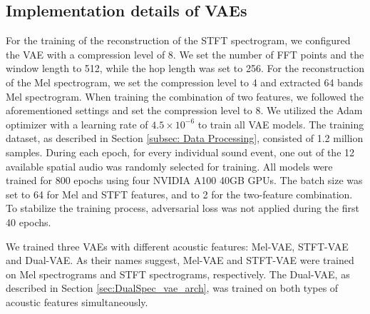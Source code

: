 \documentclass{IEEEtran}
\begin{document}
\subsection{Implementation details of VAEs}
\label{subsec: Implementation details of VAE}
For the training of the reconstruction of the STFT spectrogram, we configured the VAE with a compression level of 8. We set the number of FFT points and the window length to 512, while the hop length was set to 256. For the reconstruction of the Mel spectrogram, we set the compression level to 4 and extracted 64 bands Mel spectrogram. When training the combination of two features, we followed the aforementioned settings and set the compression level to 8. We utilized the Adam optimizer \cite{kingma2014adam} with a learning rate of $4.5 \times 10^{-6}$ to train all VAE models. The training dataset, as described in Section \ref{subsec: Data Processing}, consisted of 1.2 million samples. During each epoch, for every individual sound event, one out of the 12 available spatial audio was randomly selected for training. All models were trained for 800 epochs using four NVIDIA A100 40GB GPUs. The batch size was set to 64 for Mel and STFT features, and to 2 for the two-feature combination. To stabilize the training process, adversarial loss was not applied during the first 40 epochs.

{We trained three VAEs with different acoustic features: Mel-VAE, STFT-VAE and Dual-VAE. As their names suggest, Mel-VAE and STFT-VAE were trained on Mel spectrograms and STFT spectrograms, respectively. The Dual-VAE, as described in Section \ref{sec:DualSpec_vae_arch}, was trained on both types of acoustic features simultaneously.}
\end{document}

